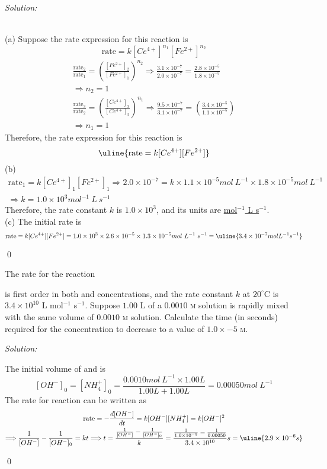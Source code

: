 \documentclass[12pt]{article}
\newenvironment{problem}[2][Problem]{\begin{trivlist}
\item[\hskip \labelsep {\bfseries #1}\hskip \labelsep {\bfseries #2.}]}{\end{trivlist}}
\newenvironment{sol}
    {\emph{Solution:}
    }
    {
    \qed
    }
\begin{document}
\begin{sol}
\\(a) Suppose the rate expression for this reaction is
\[
\text{rate}=k[Ce^{4+}]^{n_1}[Fe^{2+}]^{n_2}
\]
\begin{gather*}
\frac{\text{rate}_2}{\text{rate}_1}=(\frac{[Fe^{2+}]_2}{[Fe^{2+}]_1})^{n_2}\Longrightarrow\frac{3.1\times10^{-7}}{2.0\times10^{-7}}=\frac{2.8\times10^{-5}}{1.8\times10^{-5}}\\
\Longrightarrow n_2=1\\
\frac{\text{rate}_3}{\text{rate}_2}=(\frac{[Ce^{4+}]_3}{[Ce^{4+}]_2})^{n_1}\Longrightarrow\frac{9.5\times10^{-7}}{3.1\times10^{-7}}=(\frac{3.4\times10^{-5}}{1.1\times10^{-5}})\\
\Longrightarrow n_1=1
\end{gather*}
Therefore, the rate expression for this reaction is
\[
\uline{\text{rate}=k[Ce^{4+}][Fe^{2+}]}
\]
(b)
\begin{gather*}
\text{rate}_1=k[Ce^{4+}]_1[Fe^{2+}]_1\Longrightarrow2.0\times10^{-7}=k\times1.1\times10^{-5}mol~L^{-1}\times1.8\times10^{-5}mol~L^{-1}\\
\Longrightarrow k=1.0\times10^3mol^{-1}~L~s^{-1}
\end{gather*}
Therefore, the rate constant $k$ is \uline{$1.0\times10^3$}, and its units are \uline{mol$^{-1}$ L s$^{-1}$}.\\
(c) The initial rate is
\[
\text{rate}=k[Ce^{4+}][Fe^{2+}]=1.0\times10^3\times2.6\times10^{-5}\times1.3\times10^{-5}mol~L^{-1}~s^{-1}=\uline{3.4\times10^{-7}mol L^{-1} s^{-1}}
\]
\end{sol}

\begin{problem}{18.17}
The rate for the reaction
\begin{center}
\end{center}
is first order in both  and  concentrations, and the rate constant $k$ at $20^{\circ}$C is $3.4\times10^{10}$ L mol$^{-1}$ s$^{-1}$. Suppose $1.00$ L of a $0.0010$ \textsc{m}  solution is rapidly mixed with the same volume of $0.0010$ \textsc{m}  solution. Calculate the time (in seconds) required for the  concentration to decrease to a value of $1.0\times{-5}$ \textsc{m}.
\end{problem}
\begin{sol}
The initial volume of  and  is
\[
[OH^-]_0=[NH_4^+]_0=\frac{0.0010mol~L^{-1}\times1.00L}{1.00L+1.00L}=0.00050mol~L^{-1}
\]
The rate for reaction can be written as
\begin{gather*}
\text{rate}=-\frac{d[OH^-]}{dt}=k[OH^-][NH_4^+]=k[OH^-]^2\\
\Longrightarrow\frac{1}{[OH^-]}-\frac{1}{[OH^-]_0}=kt
\Longrightarrow t=\frac{\frac{1}{[OH^-]}-\frac{1}{[OH^-]_0}}{k}=\frac{\frac{1}{1.0\times10^{-5}}-\frac{1}{0.00050}}{3.4\times10^{10}}s=\uline{2.9\times10^{-6}s}
\end{gather*}
\end{sol}
\end{document}
